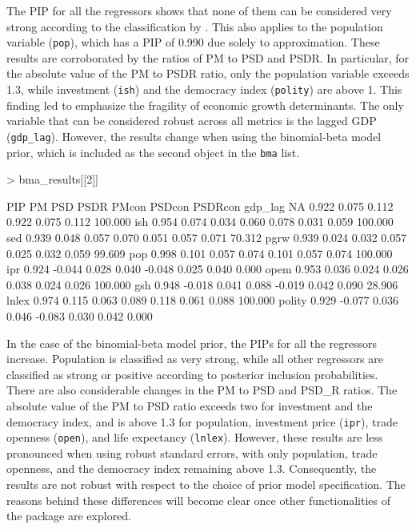 \documentclass[a4paper]{article}
\begin{document}
The PIP for all the regressors shows that none of them can be considered very strong according to the classification by \citet{Raftery+1995}. This also applies to the population variable (\verb+pop+), which has a PIP of 0.990 due solely to approximation. These results are corroborated by the ratios of PM to PSD and PSDR. In particular, for the absolute value of the PM to PSDR ratio, only the population variable exceeds 1.3, while investment (\verb+ish+) and the democracy index (\verb+polity+) are above 1. This finding led \citet{Moral+2016} to emphasize the fragility of economic growth determinants. The only variable that can be considered robust across all metrics is the lagged GDP (\verb+gdp_lag+). However, the results change when using the binomial-beta model prior, which is included as the second object in the \verb+bma+ list.
\begin{Schunk}
\begin{Sinput}
> bma_results[[2]]
\end{Sinput}
\begin{Soutput}
          PIP     PM   PSD  PSDR  PMcon PSDcon PSDRcon    %
gdp_lag    NA  0.922 0.075 0.112  0.922  0.075   0.112 100.000
ish     0.954  0.074 0.034 0.060  0.078  0.031   0.059 100.000
sed     0.939  0.048 0.057 0.070  0.051  0.057   0.071  70.312
pgrw    0.939  0.024 0.032 0.057  0.025  0.032   0.059  99.609
pop     0.998  0.101 0.057 0.074  0.101  0.057   0.074 100.000
ipr     0.924 -0.044 0.028 0.040 -0.048  0.025   0.040   0.000
opem    0.953  0.036 0.024 0.026  0.038  0.024   0.026 100.000
gsh     0.948 -0.018 0.041 0.088 -0.019  0.042   0.090  28.906
lnlex   0.974  0.115 0.063 0.089  0.118  0.061   0.088 100.000
polity  0.929 -0.077 0.036 0.046 -0.083  0.030   0.042   0.000
\end{Soutput}
\end{Schunk}

In the case of the binomial-beta model prior, the PIPs for all the regressors increase. Population is classified as very strong, while all other regressors are classified as strong or positive according to posterior inclusion probabilities. There are also considerable changes in the PM to PSD and PSD\_R ratios. The absolute value of the PM to PSD ratio exceeds two for investment and the democracy index, and is above 1.3 for population, investment price (\verb+ipr+), trade openness (\verb+open+), and life expectancy (\verb+lnlex+). However, these results are less pronounced when using robust standard errors, with only population, trade openness, and the democracy index remaining above 1.3. Consequently, the results are not robust with respect to the choice of prior model specification. The reasons behind these differences will become clear once other functionalities of the package are explored.
\end{document}
